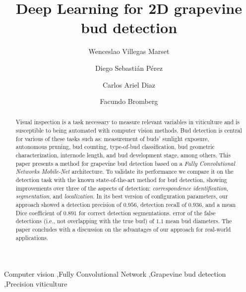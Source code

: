\documentclass[a4paper,authoryear,review]{elsarticle}
\begin{document}
\begin{frontmatter}

\title{Deep Learning for 2D grapevine bud detection}

\author[utn]{Wenceslao Villegas Marset}

\author[utn]{Diego Sebastián Pérez}

\author[utn]{Carlos Ariel Diaz}

\author[utn,conicet]{Facundo Bromberg}

\address[utn]{Universidad Tecnológica Nacional, Facultad Regional Mendoza, Grupo de Inteligencia Artificial DHARMa, Dpto. de Sistemas de la Información. Rodríguez 273, CP 5500, Mendoza, Argentina.}

\address[conicet]{Consejo Nacional de Investigaciones Científicas y Técnicas (CONICET).}


\begin{abstract}
Visual inspection is a task necessary to measure relevant variables in viticulture and is susceptible to being automated with computer vision methods. Bud detection is central for various of these tasks such as: measurement of buds’ sunlight exposure, autonomous pruning, bud counting, type-of-bud classification, bud geometric characterization, internode length, and bud development stage, among others. This paper presents a method for grapevine bud detection based on a \emph{Fully Convolutional Networks Mobile-Net} architecture. To validate its performance we compare it on the detection task with the known state-of-the-art method for bud detection, showing improvements over three of the aspects of detection: \emph{correspondence identification}, \emph{segmentation}, and \emph{localization}. In its best version of configuration parameters, our approach showed a detection precision of $0.956$, detection recall of $0.936$, and a mean Dice coefficient of $0.891$ for correct detection segmentations.  error of the false detections (i.e., not overlapping with the true bud) of $1.1$ mean bud diameters. The paper concludes with a discussion on the  advantages of our approach for real-world applications.
\end{abstract}

\begin{keyword}
Computer vision \sep Fully Convolutional Network \sep Grapevine bud detection \sep Precision viticulture
\end{keyword}

\end{frontmatter}
\end{document}
